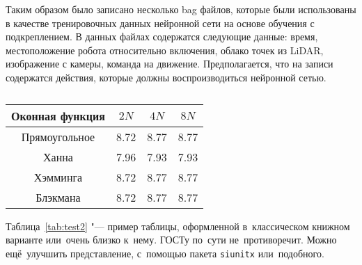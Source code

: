 Таким образом было записано несколько bag файлов, которые были использованы в качестве тренировочных данных нейронной сети на основе обучения с подкреплением. В данных файлах содержатся следующие данные: время, местоположение робота относительно включения, облако точек из LiDAR, изображение с камеры, команда на движение. Предполагается, что на записи содержатся действия, которые должны воспроизводиться нейронной сетью. 

\begin{table} [htbp]%
    \centering
    \begin{threeparttable}%
        \caption{}%
        \label{tab:test1}%
        \begin{SingleSpace}
            \begin{tabular}{| c | c | c | c |}
                \hline
                Оконная функция & \({2N}\) & \({4N}\) & \({8N}\) \\ \hline
                Прямоугольное   & 8.72     & 8.77     & 8.77     \\ \hline
                Ханна           & 7.96     & 7.93     & 7.93     \\ \hline
                Хэмминга        & 8.72     & 8.77     & 8.77     \\ \hline
                Блэкмана        & 8.72     & 8.77     & 8.77     \\ \hline
            \end{tabular}%
        \end{SingleSpace}
    \end{threeparttable}
\end{table}

Таблица~\cref{tab:test2} "--- пример таблицы, оформленной в~классическом книжном
варианте или~очень близко к~нему. \mbox{ГОСТу} по~сути не~противоречит. Можно
ещё~улучшить представление, с~помощью пакета \verb|siunitx| или~подобного.

